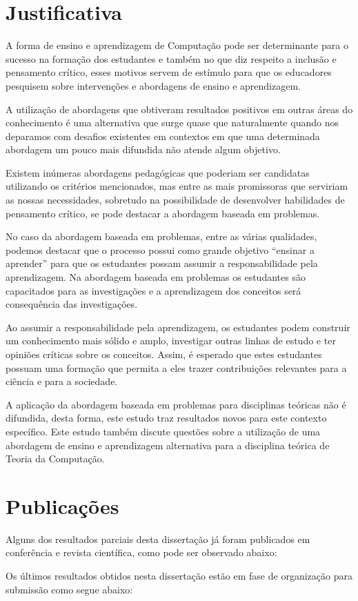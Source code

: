 \section{Justificativa}
A forma de ensino e aprendizagem de Computação pode
ser determinante para o sucesso na formação dos
estudantes e também no que diz respeito a inclusão
e pensamento crítico, esses motivos servem de estímulo
para que os educadores pesquisem sobre intervenções e
abordagens de ensino e aprendizagem.

A utilização de abordagens que obtiveram
resultados positivos em outras áreas do conhecimento é uma
alternativa que surge quase que naturalmente quando
nos deparamos com desafios existentes em contextos
em que uma determinada abordagem um pouco mais difundida
não atende algum objetivo.

Existem inúmeras abordagens pedagógicas que poderiam ser
candidatas utilizando os critérios mencionados,
mas entre as mais promissoras que serviriam
as nossas necessidades, sobretudo na possibilidade
de desenvolver habilidades de pensamento crítico, se
pode destacar a abordagem baseada em problemas.

No caso da abordagem baseada em problemas, entre as
várias qualidades, podemos destacar que o processo
possui como grande objetivo ``ensinar a aprender'' para
que os estudantes possam assumir a
responsabilidade pela aprendizagem.
Na abordagem baseada em problemas os estudantes
são capacitados para as investigações e a aprendizagem
dos conceitos será consequência das investigações.

Ao assumir a responsabilidade pela aprendizagem, os
estudantes podem construir um conhecimento mais sólido
e amplo, investigar outras linhas de estudo e ter opiniões
críticas sobre os conceitos.
Assim, é esperado que estes estudantes possuam uma
formação que permita a eles trazer contribuições
relevantes para a ciência e para a sociedade.

A aplicação da abordagem baseada em problemas
para disciplinas teóricas não é difundida, desta forma,
este estudo traz resultados novos para este contexto
específico.
Este estudo também discute questões sobre a utilização
de uma abordagem de ensino e aprendizagem alternativa
para a disciplina teórica de Teoria da Computação.

\section{Publicações}
\label{sec-publicacoes}
Alguns dos resultados parciais desta dissertação já
foram publicados em conferência e revista científica,
como pode ser observado abaixo:
\begin{itemize}

\end{itemize}
Os últimos resultados obtidos nesta dissertação estão
em fase de organização para submissão como segue abaixo:

